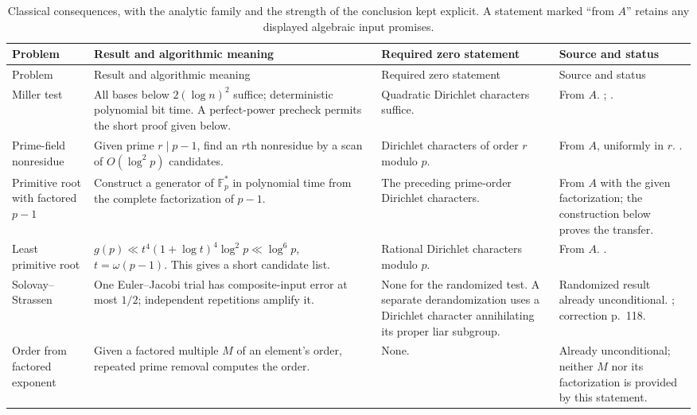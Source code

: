 \documentclass[11pt]{article}
\newcommand{\F}{\mathbb F}
\theoremstyle{definition}
\theoremstyle{remark}
\begin{document}
\begingroup
\small
\setlength{\tabcolsep}{4pt}
\renewcommand{\arraystretch}{1.18}
\begin{longtable}{@{}p{}p{}p{}p{}@{}}
\caption{Classical consequences, with the analytic family and the strength of the conclusion kept explicit. A statement marked ``from $A$'' retains any displayed algebraic input promises.}\label{tab:classical}\\
\toprule
Problem & Result and algorithmic meaning & Required zero statement & Source and status \\
\midrule
\endfirsthead
\toprule
Problem & Result and algorithmic meaning & Required zero statement & Source and status \\
\midrule
\endhead
\bottomrule
\endfoot
Miller test & All bases below $2(\log n)^2$ suffice; deterministic polynomial bit time. A perfect-power precheck permits the short proof given below. & Quadratic Dirichlet characters suffice. & From $A$. \citet[Thm.~2.2, pp.~105--106]{Schoof2008}; \citet[Thm.~2, p.~301]{Miller1976}. \\
Prime-field nonresidue & Given prime $r\mid p-1$, find an $r$th nonresidue by a scan of $O(\log^2p)$ candidates. & Dirichlet characters of order $r$ modulo $p$. & From $A$, uniformly in $r$. \citet[pp.~1--2]{LLS2015}. \\
Primitive root with factored $p-1$ & Construct a generator of $\F_p^*$ in polynomial time from the complete factorization of $p-1$. & The preceding prime-order Dirichlet characters. & From $A$ with the given factorization; the construction below proves the transfer. \\
Least primitive root & $g(p)\ll t^4(1+\log t)^4\log^2p\ll\log^6p$, $t=\omega(p-1)$. This gives a short candidate list. & Rational Dirichlet characters modulo $p$. & From $A$. \citet[Thm.~3, author p.~4; Prop.~9, p.~10; proof p.~13]{Shoup1992}. \\
Solovay--Strassen & One Euler--Jacobi trial has composite-input error at most $1/2$; independent repetitions amplify it. & None for the randomized test. A separate derandomization uses a Dirichlet character annihilating its proper liar subgroup. & Randomized result already unconditional. \citet[pp.~84--85]{SolovayStrassen1977}; correction p.~118. \\
Order from factored exponent & Given a factored multiple $M$ of an element's order, repeated prime removal computes the order. & None. & Already unconditional; neither $M$ nor its factorization is provided by this statement. \\

\end{longtable}
\end{document}
